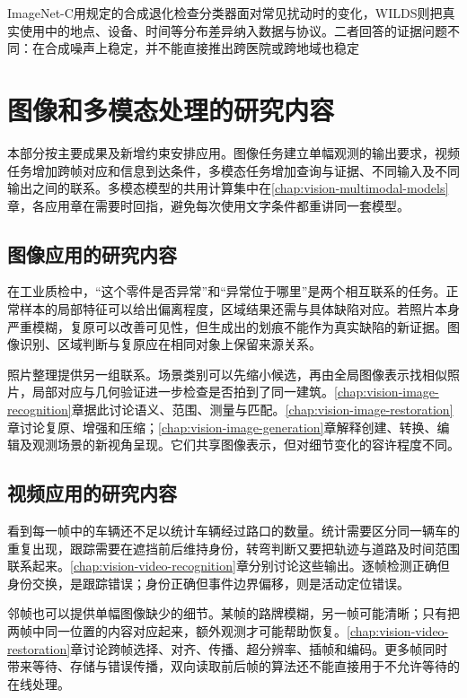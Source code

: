ImageNet-C用规定的合成退化检查分类器面对常见扰动时的变化，WILDS则把真实使用中的地点、设备、时间等分布差异纳入数据与协议。二者回答的证据问题不同：在合成噪声上稳定，并不能直接推出跨医院或跨地域也稳定

\section{图像和多模态处理的研究内容}
\label{sec:vision-overview-tasks}

本部分按主要成果及新增约束安排应用。图像任务建立单幅观测的输出要求，视频任务增加跨帧对应和信息到达条件，多模态任务增加查询与证据、不同输入及不同输出之间的联系。多模态模型的共用计算集中在\ref{chap:vision-multimodal-models}章，各应用章在需要时回指，避免每次使用文字条件都重讲同一套模型。

\subsection{图像应用的研究内容}
\label{sec:vision-overview-image-tasks}

在工业质检中，“这个零件是否异常”和“异常位于哪里”是两个相互联系的任务。正常样本的局部特征可以给出偏离程度，区域结果还需与具体缺陷对应。若照片本身严重模糊，复原可以改善可见性，但生成出的划痕不能作为真实缺陷的新证据。图像识别、区域判断与复原应在相同对象上保留来源关系。

照片整理提供另一组联系。场景类别可以先缩小候选，再由全局图像表示找相似照片，局部对应与几何验证进一步检查是否拍到了同一建筑。\ref{chap:vision-image-recognition}章据此讨论语义、范围、测量与匹配。\ref{chap:vision-image-restoration}章讨论复原、增强和压缩；\ref{chap:vision-image-generation}章解释创建、转换、编辑及观测场景的新视角呈现。它们共享图像表示，但对细节变化的容许程度不同。

\subsection{视频应用的研究内容}
\label{sec:vision-overview-video-tasks}

看到每一帧中的车辆还不足以统计车辆经过路口的数量。统计需要区分同一辆车的重复出现，跟踪需要在遮挡前后维持身份，转弯判断又要把轨迹与道路及时间范围联系起来。\ref{chap:vision-video-recognition}章分别讨论这些输出。逐帧检测正确但身份交换，是跟踪错误；身份正确但事件边界偏移，则是活动定位错误。

邻帧也可以提供单幅图像缺少的细节。某帧的路牌模糊，另一帧可能清晰；只有把两帧中同一位置的内容对应起来，额外观测才可能帮助恢复。\ref{chap:vision-video-restoration}章讨论跨帧选择、对齐、传播、超分辨率、插帧和编码。更多帧同时带来等待、存储与错误传播，双向读取前后帧的算法还不能直接用于不允许等待的在线处理。


